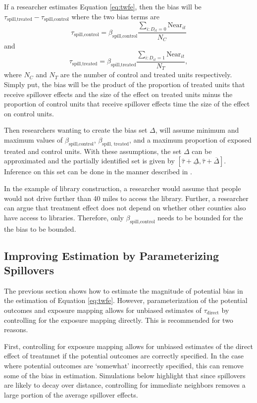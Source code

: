 \documentclass[11pt]{article}
\begin{document}
If a researcher estimates Equation \ref{eq:twfe}, then the bias will be $\tau_{\text{spill,treated}} - \tau_{\text{spill,control}}$ where the two bias terms are \[ 
    \tau_{\text{spill,control}} = \beta_{\text{spill,control}} \frac{\sum_{i: D_{it} = 0} \text{Near}_{it}}{N_C}
\] and \[ 
    \tau_{\text{spill,treated}} = \beta_{\text{spill,treated}} \frac{\sum_{i: D_{it} = 1} \text{Near}_{it}}{N_T},
\]
where $N_C$ and $N_T$ are the number of control and treated units respectively. Simply put, the bias will be the product of the proportion of treated units that receive spillover effects and the size of the effect on treated units minus the proportion of control units that receive spillover effects time the size of the effect on control units. 

Then researchers wanting to create the bias set $\Delta$, will assume minimum and maximum values of $\beta_{\text{spill,control}}$, $\beta_{\text{spill, treated}}$, and a maximum proportion of exposed treated and control units. With these assumptions, the set $\Delta$ can be approximated and the partially identified set is given by $[\hat{\tau} + \underline{\Delta}, \hat{\tau} + \overline{\Delta}]$. Inference on this set can be done in the manner described in \citet{Rambachan_Roth_2020}. 

In the example of library construction, a researcher would assume that people would not drive further than 40 miles to access the library. Further, a researcher can argue that treatment effect does not depend on whether other counties also have access to libraries. Therefore, only $\beta_{\text{spill,control}}$ needs to be bounded for the the bias to be bounded. 


\subsection{Improving Estimation by Parameterizing Spillovers}

The previous section shows how to estimate the magnitude of potential bias in the estimation of Equation \ref{eq:twfe}. However, parameterization of the potential outcomes and exposure mapping allows for unbiased estimates of $\tau_{\text{direct}}$ by controlling for the exposure mapping directly. This is recommended for two reasons. 

First, controlling for exposure mapping allows for unbiased estimates of the direct effect of treatmnet if the potential outcomes are correctly specified. In the case where potential outcomes are `somewhat' incorrectly specified, this can remove some of the bias in estimation. Simulations below highlight that since spillovers are likely to decay over distance, controlling for immediate neighbors removes a large portion of the average spillover effects.
\end{document}
